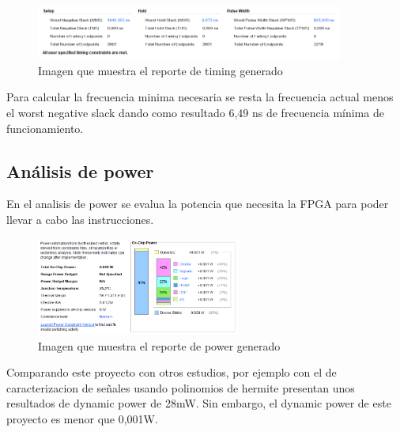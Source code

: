 	\begin{figure}[h!]
		\centering
		\includegraphics[width=0.9\textwidth]{./Images/img_res_experimentales/reportetiming.png}
		\caption{Imagen que muestra el reporte de timing generado}
		\label{fig:reporteTiming}
	\end{figure} 

	Para calcular la frecuencia minima necesaria se resta la frecuencia actual menos el worst negative slack dando como resultado 6,49 ns de frecuencia mínima de funcionamiento. 

\subsection{Análisis de power}

	En el analisis de power se evalua la potencia que necesita la FPGA para poder llevar a cabo las instrucciones.

	\begin{figure}[h!]
		\centering
		\includegraphics[width=0.6\textwidth]{./Images/img_res_experimentales/reportepower.png}
		\caption{Imagen que muestra el reporte de power generado}
		\label{fig:reportePower}
	\end{figure} 

	Comparando este proyecto con otros estudios, por ejemplo con el de caracterizacion de señales usando polinomios de hermite presentan unos resultados de dynamic power de 28mW.
	Sin embargo, el dynamic power de este proyecto es menor que 0,001W.








	